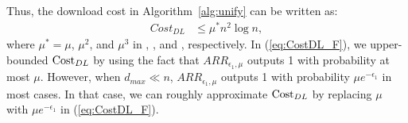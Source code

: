 Thus, 
the download cost in Algorithm~\ref{alg:unify} 
can be written as:
\begin{align}
   Cost_{DL} &\leq \mu^* n^2 \log n,  \label{eq:CostDL_F}
\end{align}
where $\mu^* = \mu$, $\mu^2$, and $\mu^3$ in \AlgOne{}, \AlgTwo{}, and \AlgThree{}, respectively. 
In (\ref{eq:CostDL_F}), 
we upper-bounded $\mathrm{Cost}_{DL}{}$ by using the fact that $ARR_{\epsilon_1,\mu}$ outputs 1 with probability at most $\mu$. 
However, when $d_{max} \ll n$, 
$ARR_{\epsilon_1,\mu}$ outputs 1 with probability $\mu e^{- \epsilon_1}$ in most cases. 
In that case, we can roughly approximate $\mathrm{Cost}_{DL}{}$ by replacing $\mu$ with $\mu e^{- \epsilon_1}$ in (\ref{eq:CostDL_F}). 

